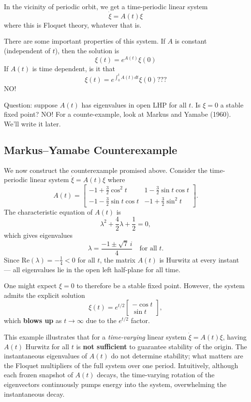 \documentclass{article}
\begin{document}
In the vicinity of periodic orbit, we get a time-periodic linear system 
\[\dot{\xi}=A(t)\xi\]
where this is Floquet theory, whatever that is.

There are some important properties of this system. If $A$ is constant (independent of $t$), then the solution is 
\[\xi(t)=e^{A(t)}\xi(0)\]
If $A(t)$ is time dependent, is it that 
\[\xi(t)=e^{\int_{0}^{t}A(t)dt}\xi(0)???\]
NO!

Question: suppose $A(t)$ has eigenvalues in open LHP for all $t$. Is $\xi=0$ a stable fixed point? NO! For a counte-example, look at Markus and Yamabe (1960). We'll write it later.

\subsection{Markus--Yamabe Counterexample}

We now construct the counterexample promised above. Consider the time-periodic linear system $\dot{\xi} = A(t)\xi$ where
\[
A(t) = \begin{bmatrix} -1 + \frac{3}{2}\cos^2 t & 1 - \frac{3}{2}\sin t \cos t \\ -1 - \frac{3}{2}\sin t \cos t & -1 + \frac{3}{2}\sin^2 t \end{bmatrix}.
\]
The characteristic equation of $A(t)$ is
\[
\lambda^2 + \frac{4}{2}\lambda + \frac{1}{2} = 0,
\]
which gives eigenvalues
\[
\lambda = \frac{-1 \pm \sqrt{7}\,i}{4} \quad \text{for all } t.
\]
Since $\mathrm{Re}(\lambda) = -\tfrac{1}{4} < 0$ for all $t$, the matrix $A(t)$ is Hurwitz at every instant --- all eigenvalues lie in the open left half-plane for all time.

One might expect $\xi = 0$ to therefore be a stable fixed point. However, the system admits the explicit solution
\[
\xi(t) = e^{t/2}\begin{bmatrix} -\cos t \\ \sin t \end{bmatrix},
\]
which \textbf{blows up} as $t \to \infty$ due to the $e^{t/2}$ factor.

This example illustrates that for a \emph{time-varying} linear system $\dot{\xi} = A(t)\xi$, having $A(t)$ Hurwitz for all $t$ is \textbf{not sufficient} to guarantee stability of the origin. The instantaneous eigenvalues of $A(t)$ do not determine stability; what matters are the Floquet multipliers of the full system over one period. Intuitively, although each frozen snapshot of $A(t)$ decays, the time-varying rotation of the eigenvectors continuously pumps energy into the system, overwhelming the instantaneous decay.
\end{document}

